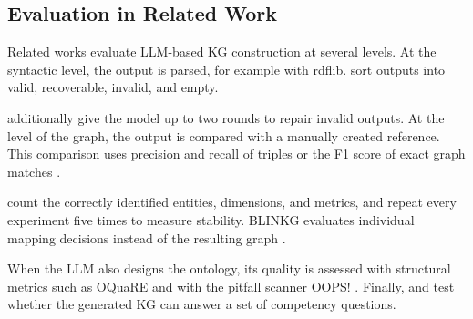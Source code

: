 
\clearpage
\subsection{Evaluation in Related Work}
\label{sec:rw-eval}
Related works evaluate LLM-based KG construction at several levels. At the syntactic level, the output is parsed, for example with rdflib. \citet{martin2026performance} sort outputs into valid, recoverable, invalid, and empty. 

\citet{hofer2024towards} additionally give the model up to two rounds to repair invalid outputs. At the level of the graph, the output is compared with a manually created reference. This comparison uses precision and recall of triples \citep{hariri2025towards, martin2026performance} or the F1 score of exact graph matches \citep{hofer2024towards}. 

\citet{pellegrino2025quality} count the correctly identified entities, dimensions, and metrics, and repeat every experiment five times to measure stability. BLINKG evaluates individual mapping decisions instead of the resulting graph \citep{castedo2026blinkg}. 

When the LLM also designs the ontology, its quality is assessed with structural metrics such as OQuaRE and with the pitfall scanner OOPS! \citep{valcalvo2025ontogenix, kommineni2024human}. Finally, \citet{kommineni2024human} and \citet{hariri2025towards} test whether the generated KG can answer a set of competency questions.

